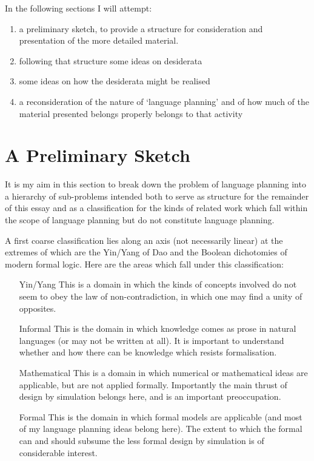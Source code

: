 \documentclass[numreferences]{rbjk}
\begin{document}
\begin{article}
In the following sections I will attempt:

\begin{enumerate}
\item a preliminary sketch, to provide a structure for consideration and presentation of the more detailed material.
\item following that structure some ideas on desiderata
\item some ideas on how the desiderata might be realised
\item a reconsideration of the nature of `language planning' and of how much of the material presented belongs properly belongs to that activity
\end{enumerate}

\section{A Preliminary Sketch}

It is my aim in this section to break down the problem of language planning into a hierarchy of sub-problems intended both to serve as structure for the remainder of this essay and as a classification for the kinds of related work which fall within the scope of language planning but do not constitute language planning.

A first coarse classification lies along an axis (not necessarily linear) at the extremes of which are the Yin/Yang of Dao and the Boolean dichotomies of modern formal logic.
Here are the areas which fall under this classification:

\begin{itemize}
\item[Yin/Yang] This is a domain in which the kinds of concepts involved do not seem to obey the law of non-contradiction, in which one may find a unity of opposites.
\item[Informal] This is the domain in which knowledge comes as prose in natural languages (or may not be written at all).
It is important to understand whether and how there can be knowledge which resists formalisation.
\item[Mathematical] This is a domain in which numerical or mathematical ideas are applicable, but are not applied formally.
Importantly the main thrust of design by simulation belongs here, and is an important preoccupation.
\item[Formal] This is the domain in which formal models are applicable (and most of my language planning ideas belong here).
The extent to which the formal can and should subsume the less formal design by simulation is of considerable interest.
\end{itemize}


\end{article}
\end{document}
